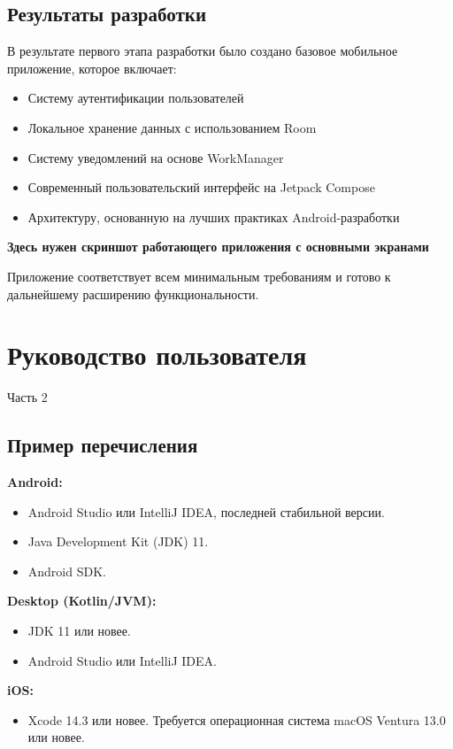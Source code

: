 \documentclass[14pt, russian]{scrartcl}
\begin{document}
\subsection{Результаты разработки}\label{sect:results}

В результате первого этапа разработки было создано базовое мобильное приложение, которое включает:

\begin{itemize}
\item Систему аутентификации пользователей
\item Локальное хранение данных с использованием Room
\item Систему уведомлений на основе WorkManager
\item Современный пользовательский интерфейс на Jetpack Compose
\item Архитектуру, основанную на лучших практиках Android-разработки
\end{itemize}

\textbf{Здесь нужен скриншот работающего приложения с основными экранами}

Приложение соответствует всем минимальным требованиям и готово к дальнейшему расширению функциональности.

\section{Руководство пользователя}

Часть 2

\subsection{Пример перечисления}

\textbf{Android:}
\begin{itemize}
\item Android Studio или IntelliJ IDEA, последней стабильной версии.
\item Java Development Kit (JDK) 11.
\item Android SDK.
\end{itemize}

\textbf{Desktop (Kotlin/JVM):}
\begin{itemize}
\item JDK 11 или новее.
\item Android Studio или IntelliJ IDEA.
\end{itemize}

\textbf{iOS:}
\begin{itemize}
\item Xcode 14.3 или новее. Требуется операционная система macOS Ventura 13.0 или новее.
\end{itemize}
\end{document}
